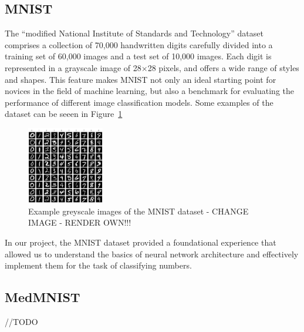 \subsection{MNIST}\label{mnist}
The ``modified National Institute of Standards and Technology'' dataset comprises a collection of 70,000 handwritten digits carefully divided into a training set of 60,000 images and a test set of 10,000 images. Each digit is represented in a grayscale image of 28$\times$28 pixels, and offers a wide range of styles and shapes. This feature makes MNIST not only an ideal starting point for novices in the field of machine learning, but also a benchmark for evaluating the performance of different image classification models. Some examples of the dataset can be seeen in Figure~\ref{fig:MNIST}

\begin{figure}
    \centering
    \includegraphics[width=0.3\textwidth]{figures/MNIST.png}
    \caption{Example greyscale images of the MNIST dataset - CHANGE IMAGE - RENDER OWN!!!}\label{fig:MNIST}
\end{figure}


In our project, the MNIST dataset provided a foundational experience that allowed us to understand the basics of neural network architecture and effectively implement them for the task of classifying numbers.



\subsection{MedMNIST}\label{medmnist}
//TODO